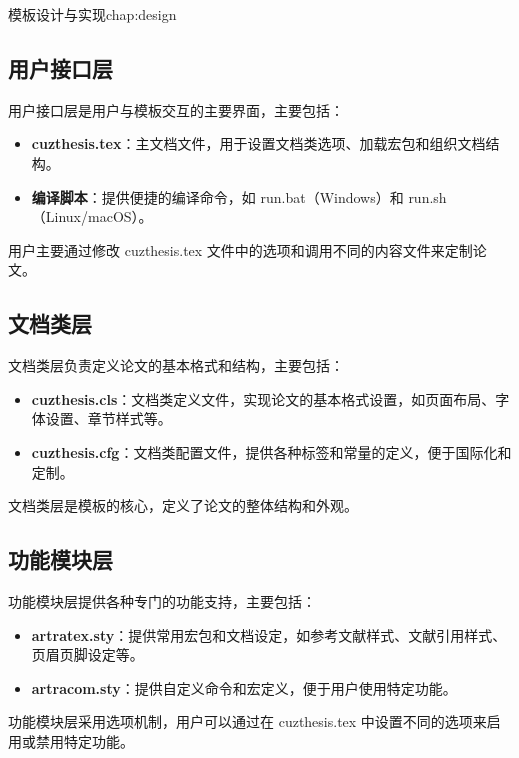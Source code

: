 \begin{cuzchapter}{模板设计与实现}{chap:design}
	\subsection{用户接口层}
	
	用户接口层是用户与模板交互的主要界面，主要包括：
	
	\begin{itemize}
		\item \textbf{cuzthesis.tex}：主文档文件，用于设置文档类选项、加载宏包和组织文档结构。
		
		\item \textbf{编译脚本}：提供便捷的编译命令，如 run.bat（Windows）和 run.sh（Linux/macOS）。
	\end{itemize}
	
	用户主要通过修改 cuzthesis.tex 文件中的选项和调用不同的内容文件来定制论文。
	
	\subsection{文档类层}
	
	文档类层负责定义论文的基本格式和结构，主要包括：
	
	\begin{itemize}
		\item \textbf{cuzthesis.cls}：文档类定义文件，实现论文的基本格式设置，如页面布局、字体设置、章节样式等。
		
		\item \textbf{cuzthesis.cfg}：文档类配置文件，提供各种标签和常量的定义，便于国际化和定制。
	\end{itemize}
	
	文档类层是模板的核心，定义了论文的整体结构和外观。
	
	\subsection{功能模块层}
	
	功能模块层提供各种专门的功能支持，主要包括：
	
	\begin{itemize}
		\item \textbf{artratex.sty}：提供常用宏包和文档设定，如参考文献样式、文献引用样式、页眉页脚设定等。
		
		\item \textbf{artracom.sty}：提供自定义命令和宏定义，便于用户使用特定功能。
	\end{itemize}
	
	功能模块层采用选项机制，用户可以通过在 cuzthesis.tex 中设置不同的选项来启用或禁用特定功能。
	

\end{cuzchapter}
